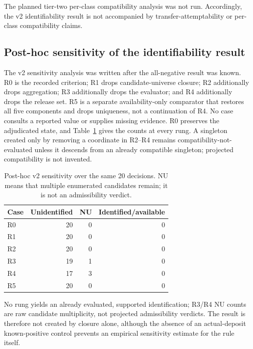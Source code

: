 The planned tier-two per-class compatibility analysis was not run. Accordingly, the v2
identifiability result is not accompanied by transfer-attemptability or per-class compatibility
claims.

\subsection{Post-hoc sensitivity of the identifiability result}
\label{sec:results:sensitivity}

The v2 sensitivity analysis was written after the all-negative result was known. R0 is the
recorded criterion; R1 drops candidate-universe closure; R2 additionally drops aggregation;
R3 additionally drops the evaluator; and R4 additionally drops the release set. R5 is a
separate availability-only comparator that restores all five components and drops uniqueness,
not a continuation of R4. No case consults a reported value or supplies missing evidence.
R0 preserves the adjudicated state, and Table~\ref{tab:sensitivity} gives the counts at every
rung. A singleton created only by removing a coordinate in
R2--R4 remains compatibility-not-evaluated unless it descends from an already compatible
singleton; projected compatibility is not invented.

\begin{table}[t]
\caption{Post-hoc v2 sensitivity over the same 20 decisions. NU means that multiple
enumerated candidates remain; it is not an admissibility verdict.}
\label{tab:sensitivity}
\begin{tabular}{lrrr}
\toprule
Case & Unidentified & NU & Identified/available \\
\midrule
R0 & 20 & 0 & 0 \\
R1 & 20 & 0 & 0 \\
R2 & 20 & 0 & 0 \\
R3 & 19 & 1 & 0 \\
R4 & 17 & 3 & 0 \\
R5 & 20 & 0 & 0 \\
\bottomrule
\end{tabular}
\end{table}

No rung yields an already evaluated, supported identification; R3/R4 NU counts are raw
candidate multiplicity, not projected admissibility verdicts. The result is therefore not
created by closure alone,
although the absence of an actual-deposit known-positive control prevents an empirical
sensitivity estimate for the rule itself.

